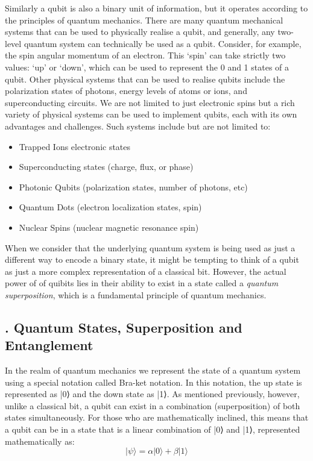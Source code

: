 \documentclass{elbioimp2}
\begin{document}
Similarly a qubit is also a binary unit of information, but it operates according to the principles of quantum mechanics. There are many quantum mechanical systems that can be used to physically realise a qubit, and generally, any two-level quantum system can technically be used as a qubit. Consider, for example, the spin angular momentum of an electron. This `spin' can take strictly two values: `up' or `down', which can be used to represent the 0 and 1 states of a qubit. Other physical systems that can be used to realise qubits include the polarization states of photons, energy levels of atoms or ions, and superconducting circuits. We are not limited to just electronic spins but a rich variety of physical systems can be used to implement qubits, each with its own advantages and challenges. Such systems include but are not limited to:
\begin{itemize}
  \item Trapped Ions electronic states
  \item Superconducting states (charge, flux, or phase)
  \item Photonic Qubits (polarization states, number of photons, etc)
  \item Quantum Dots (electron localization states, spin)
  \item Nuclear Spins (nuclear magnetic resonance spin)
\end{itemize}

When we consider that the underlying quantum system is being used as just a different way to encode a binary state, it might be tempting to think of a qubit as just a more complex representation of a classical bit. However, the actual power of of quibits lies in their ability to exist in a state called a \textit{quantum superposition}, which is a fundamental principle of quantum mechanics.


\subsection{. Quantum States, Superposition and Entanglement}
In the realm of quantum mechanics we represent the state of a quantum system using a special notation called Bra-ket notation. In this notation, the up state is represented as |0⟩ and the down state as |1⟩. As mentioned previously, however, unlike a classical bit, a qubit can exist in a combination (superposition) of both states simultaneously. For those who are mathematically inclined, this means that a qubit can be in a state that is a linear combination of |0⟩ and |1⟩, represented mathematically as:
\begin{equation}
  |\psi\rangle = \alpha|0\rangle + \beta|1\rangle
\end{equation}
\end{document}
